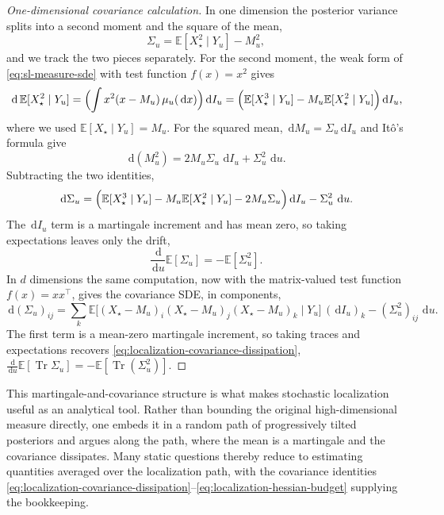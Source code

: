 \documentclass{amsart}
\numberwithin{equation}{section}
\theoremstyle{plain}
\theoremstyle{definition}
\theoremstyle{remark}
\DeclareMathOperator{\Tr}{Tr}
\newcommand{\E}{\mathbb{E}}
\newcommand{\dd}{\,\mathrm{d}}
\begin{document}
\begin{proof}[One-dimensional covariance calculation]
In one dimension the posterior variance splits into a second moment and the
square of the mean,
\[
    \Sigma_u=\E[X_\star^2\mid Y_u]-M_u^2,
\]
and we track the two pieces separately.  For the second moment, the weak form
of \eqref{eq:sl-measure-sde} with test function $f(x)=x^2$ gives
\[
    \dd\,\E[X_\star^2\mid Y_u]
    =
    \Bigl(\int x^2(x-M_u)\,\mu_u(\dd x)\Bigr)\dd I_u
    =
    \Bigl(\E[X_\star^3\mid Y_u]-M_u\E[X_\star^2\mid Y_u]\Bigr)\dd I_u,
\]
where we used $\E[X_\star\mid Y_u]=M_u$.  For the squared mean,
$\dd M_u=\Sigma_u\dd I_u$ and It\^o's formula give
\[
    \dd(M_u^2)=2M_u\Sigma_u\,\dd I_u+\Sigma_u^2\,\dd u.
\]
Subtracting the two identities,
\[
    \dd\Sigma_u
    =
    \Bigl(\E[X_\star^3\mid Y_u]-M_u\E[X_\star^2\mid Y_u]-2M_u\Sigma_u\Bigr)\dd I_u
    -
    \Sigma_u^2\,\dd u.
\]
The $\dd I_u$ term is a martingale increment and has mean zero, so taking
expectations leaves only the drift,
\[
    \frac{\dd}{\dd u}\E[\Sigma_u]=-\E[\Sigma_u^2].
\]
In $d$ dimensions the same computation, now with the matrix-valued test
function $f(x)=xx^\top$, gives the covariance SDE, in components,
\begin{equation}\label{eq:localization-covariance-sde}
    \dd(\Sigma_u)_{ij}
    =
    \sum_k
    \E\bigl[(X_\star-M_u)_i(X_\star-M_u)_j(X_\star-M_u)_k\mid Y_u\bigr]\,(\dd I_u)_k
    -
    (\Sigma_u^2)_{ij}\,\dd u.
\end{equation}
The first term is a mean-zero martingale increment, so taking traces and
expectations recovers \eqref{eq:localization-covariance-dissipation},
$\frac{\dd}{\dd u}\E[\Tr\Sigma_u]=-\E[\Tr(\Sigma_u^2)]$.
\end{proof}

This martingale-and-covariance structure is what makes stochastic localization
useful as an analytical tool.  Rather than bounding the original
high-dimensional measure directly, one embeds it in a random path of
progressively tilted posteriors and argues along the path, where the mean is a
martingale and the covariance dissipates.  Many static questions thereby reduce
to estimating quantities averaged over the localization path, with the
covariance identities
\eqref{eq:localization-covariance-dissipation}--\eqref{eq:localization-hessian-budget}
supplying the bookkeeping.
\end{document}
